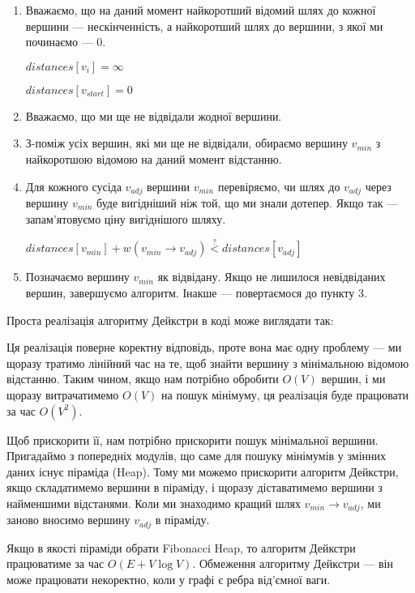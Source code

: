 \documentclass[12pt,a4paper]{report}
\begin{document}
\begin{enumerate}
    \item Вважаємо, що на даний момент найкоротший відомий шлях до кожної вершини --- нескінченність, а найкоротший шлях до вершини, з якої ми починаємо --- 0.

          \(distances[v_{i}] = \infty \)

          \(distances[v_{start}] = 0\)

    \item Вважаємо, що ми ще не відвідали жодної вершини.
    \item З-поміж усіх вершин, які ми ще не відвідали, обираємо вершину \(v_{min}\) з найкоротшою відомою на даний момент відстанню.
    \item Для кожного сусіда \(v_{adj}\) вершини \(v_{min}\) перевіряємо, чи шлях до \(v_{adj}\) через вершину \(v_{min}\) буде вигідніший ніж той, що ми знали дотепер.
          Якщо так --- запам’ятовуємо ціну вигіднішого шляху.

          \(distances[v_{min}] + w(v_{min} \rightarrow v_{adj}) \stackrel{?}{<} distances[v_{adj}]\)

    \item Позначаємо вершину \(v_{min}\) як відвідану. Якщо не лишилося невідвіданих вершин, завершуємо алгоритм. Інакше --- повертаємося до пункту 3.
\end{enumerate}


Проста реалізація алгоритму Дейкстри в коді може виглядати так:



Ця реалізація поверне коректну відповідь, проте вона має одну проблему --- ми щоразу тратимо лінійний час на те, щоб знайти вершину з мінімальною відомою відстанню.
Таким чином, якщо нам потрібно обробити \(O(V)\) вершин, і ми щоразу витрачатимемо \(O(V)\) на пошук мінімуму, ця реалізація буде працювати за час \(O(V^2)\).

Щоб прискорити її, нам потрібно прискорити пошук мінімальної вершини. Пригадаймо з попередніх модулів, що саме для пошуку мінімумів у змінних даних існує піраміда (Heap). Тому ми можемо прискорити алгоритм Дейкстри, якщо складатимемо вершини в піраміду, і щоразу діставатимемо вершини з найменшими відстанями. Коли ми знаходимо кращий шлях \(v_{min} \rightarrow v_{adj}\), ми заново вносимо вершину \(v_{adj}\) в піраміду.



Якщо в якості піраміди обрати Fibonacci Heap, то алгоритм Дейкстри працюватиме за час \(O(E + V \log V)\). Обмеження алгоритму Дейкстри --- він може працювати некоректно, коли у графі є ребра від’ємної ваги.
\end{document}

